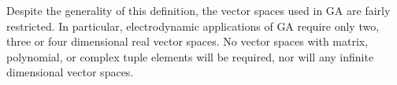 %
Despite the generality of this definition, the vector spaces used in GA are fairly restricted.
In particular, electrodynamic applications of GA require only two, three or four dimensional real vector spaces.
No vector spaces with matrix, polynomial, or complex tuple elements will be required, nor will any
infinite dimensional vector spaces.

